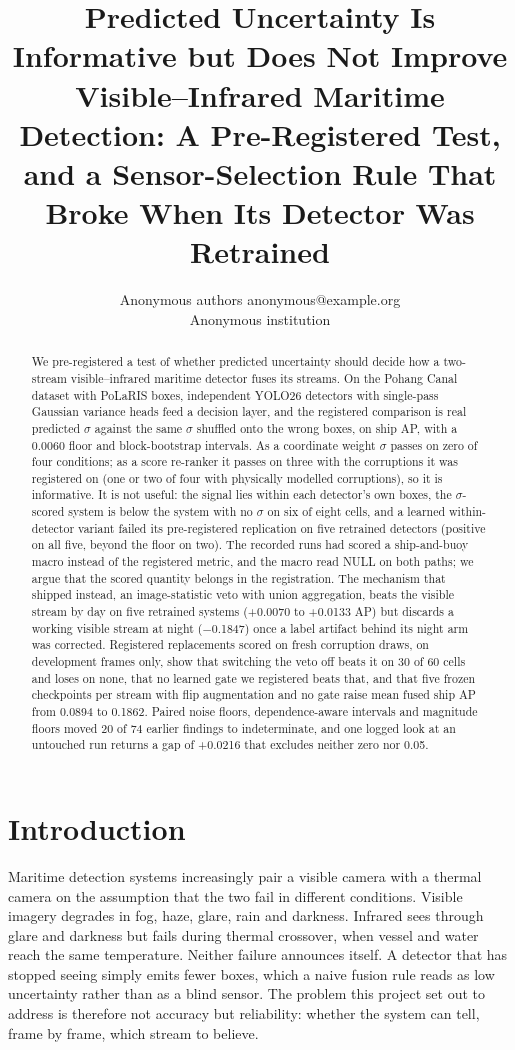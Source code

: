 \documentclass[10pt]{article}
\title{Predicted Uncertainty Is Informative but Does Not Improve Visible--Infrared Maritime Detection: A Pre-Registered Test, and a Sensor-Selection Rule That Broke When Its Detector Was Retrained}
\author{\name Anonymous authors \email anonymous@example.org \\
      \addr Anonymous institution}
\begin{document}
\maketitle

\begin{abstract}
We pre-registered a test of whether predicted uncertainty should decide how a two-stream visible--infrared maritime detector fuses its streams. On the Pohang Canal dataset with PoLaRIS boxes, independent YOLO26 detectors with single-pass Gaussian variance heads feed a decision layer, and the registered comparison is real predicted $\sigma$ against the same $\sigma$ shuffled onto the wrong boxes, on ship AP, with a 0.0060 floor and block-bootstrap intervals. As a coordinate weight $\sigma$ passes on zero of four conditions; as a score re-ranker it passes on three with the corruptions it was registered on (one or two of four with physically modelled corruptions), so it is informative. It is not useful: the signal lies within each detector's own boxes, the $\sigma$-scored system is below the system with no $\sigma$ on six of eight cells, and a learned within-detector variant failed its pre-registered replication on five retrained detectors (positive on all five, beyond the floor on two). The recorded runs had scored a ship-and-buoy macro instead of the registered metric, and the macro read NULL on both paths; we argue that the scored quantity belongs in the registration. The mechanism that shipped instead, an image-statistic veto with union aggregation, beats the visible stream by day on five retrained systems (+0.0070 to +0.0133 AP) but discards a working visible stream at night ($-$0.1847) once a label artifact behind its night arm was corrected. Registered replacements scored on fresh corruption draws, on development frames only, show that switching the veto off beats it on 30 of 60 cells and loses on none, that no learned gate we registered beats that, and that five frozen checkpoints per stream with flip augmentation and no gate raise mean fused ship AP from 0.0894 to 0.1862. Paired noise floors, dependence-aware intervals and magnitude floors moved 20 of 74 earlier findings to indeterminate, and one logged look at an untouched run returns a gap of +0.0216 that excludes neither zero nor 0.05.
\end{abstract}

\section{Introduction}\label{sec:1}
Maritime detection systems increasingly pair a visible camera with a thermal camera on the assumption that the two fail in different conditions. Visible imagery degrades in fog, haze, glare, rain and darkness. Infrared sees through glare and darkness but fails during thermal crossover, when vessel and water reach the same temperature. Neither failure announces itself. A detector that has stopped seeing simply emits fewer boxes, which a naive fusion rule reads as low uncertainty rather than as a blind sensor. The problem this project set out to address is therefore not accuracy but reliability: whether the system can tell, frame by frame, which stream to believe.
\end{document}

